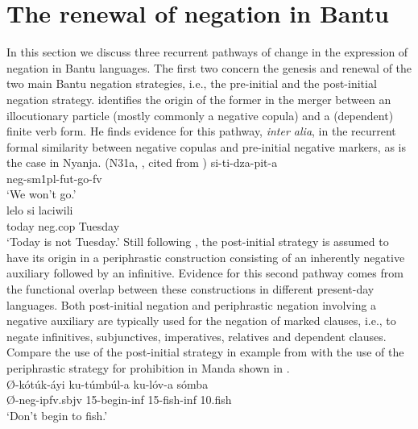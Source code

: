 \documentclass[output=paper]{langscibook}
\begin{document}
\section{The renewal of negation in Bantu}\label{sec:1:2} In this section
we discuss three recurrent pathways of change in the expression of negation
in Bantu languages. The first two concern the genesis and renewal of the
two main Bantu negation strategies, i.e., the pre-initial and the
post-initial negation strategy. \citet{Guldemann1996,Guldemann1999}
identifies the origin of the former in the merger between an illocutionary
particle (mostly commonly a negative copula) and a (dependent) finite verb
form. He finds evidence for this pathway, {\it inter alia}, in the
recurrent formal similarity between negative copulas and pre-initial
negative markers, as is the case in Nyanja.
\ea\label{ex:nyanja-go-tuesday} 
 (N31a, \citealt[174]{StevickHollander1965}, cited from \citealt[568]{Guldemann1999})
\ea\label{ex:nyanja-go} \gll
si-ti-dza-pit-a\\ {\sc neg-sm}1pl-{\sc fut}-go-{\sc fv}\\ \glt `We won't
go.'\\ \ex\label{ex:nyanja-tuesday} \gll lelo si laciwili\\ today {\sc
neg.cop} Tuesday\\ \glt `Today is not Tuesday.’ \z\z Still following
\citet{Guldemann1996,Guldemann1999}, the post-initial strategy is assumed
to have its origin in a periphrastic construction consisting of an
inherently negative auxiliary followed by an infinitive. Evidence for this
second pathway comes from the functional overlap between these
constructions in different present-day languages. Both post-initial
negation and periphrastic negation involving a negative auxiliary are
typically used for the negation of marked clauses, i.e., to negate
infinitives, subjunctives, imperatives, relatives and dependent clauses.
Compare the use of the post-initial strategy in example 
from  with the use of the periphrastic strategy for prohibition in
Manda shown in .  \ea\label{ex:manda-fish}
\\ \gll Ø-kótúk-áyi
ku-túmbúl-a ku-lóv-a sómba\\ Ø-{\sc neg-ipfv.sbjv} 15-begin-{\sc inf}
15-fish-{\sc inf} 10.fish\\ \glt `Don't begin to fish.' \z
\end{document}
